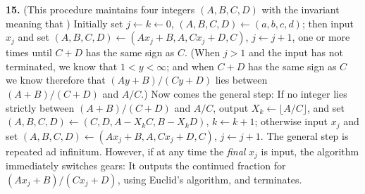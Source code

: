 {\bf 15.} (This procedure maintains four integers $(A, B, C, D)$ with the invariant meaning
that ) Initially set $j \leftarrow k \leftarrow 0$, $(A, B, C, D) \leftarrow (a, b, c, d)$;
then input $x_j$ and set $(A, B, C, D) \leftarrow (Ax_j + B, A, Cx_j + D, C)$, $j \leftarrow j + 1$, one or
more times until $C + D$ has the same sign as $C$. (When $j > 1$ and the input has not
terminated, we know that $1 < y < \infty$; and when $C + D$ has the same sign as $C$ we
know therefore that $(Ay + B)/(Cy + D)$ lies between $(A + B)/(C + D)$ and $A/C$.)
Now comes the general step: If no integer lies strictly between $(A + B)/(C + D)$
and $A/C$, output $X_k \leftarrow \lfloor A/C \rfloor$, and set $(A, B, C, D) \leftarrow (C, D, A - X_ k C, B - X_k D)$,
$k \leftarrow k + 1$; otherwise input $x_j$ and set $(A, B,C, D) \leftarrow (Ax_j + B, A, Cx_j + D,C)$,
$j \leftarrow j + 1$. The general step is repeated ad infinitum. However, if at any time the
\emph{final} $x_j$ is input, the algorithm immediately switches gears: It outputs the continued
fraction for $(Ax_j + B)/(Cx_j + D)$, using Euclid's algorithm, and terminates.
